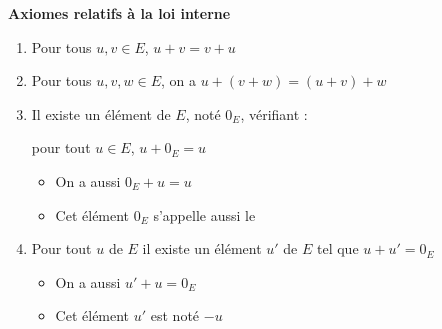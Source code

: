 \begin{frame}
\textbf{Axiomes relatifs à la loi interne}

 \begin{enumerate}
 
\pause 
 \item {} 
 
 Pour tous $u,v \in E$, $u + v = v + u$
 
\pause

 \item {} 

 Pour tous $u,v,w \in E$, on a $u + (v+w) = (u+v) +w$
 
\pause 

 \item {}


 Il existe un élément de $E$, noté $0_{E}$, vérifiant : 
  
   \hfil pour tout $u \in E$, $u+0_{E}=u$
   
   \pause
   \begin{itemize}
     \item On a aussi $0_E+u=u$
     \pause
     \item Cet élément $0_E$ s'appelle aussi le    
   \end{itemize}
   
\pause 
 
 \item {}
 
 Pour tout $u$ de $E$ il existe un élément $u'$ de $E$ tel que 
$u+u'=0_E$ 
\pause
   \begin{itemize}
     \item On a aussi $u'+u=0_E$
     \pause
     \item Cet élément $u'$ est noté $-u$
   \end{itemize}


 \end{enumerate} 

\end{frame}


